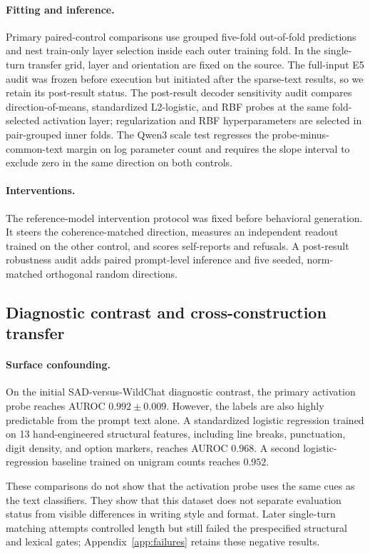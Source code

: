 \documentclass{article}
\begin{document}
\paragraph{Fitting and inference.}
Primary paired-control comparisons use grouped five-fold out-of-fold
predictions and nest train-only layer selection inside each outer training fold.
In the single-turn transfer grid, layer and orientation are fixed on the source.
The full-input E5 audit was frozen before execution but initiated after the
sparse-text results, so we retain its post-result status. The post-result decoder
sensitivity audit compares direction-of-means, standardized L2-logistic, and RBF
probes at the same fold-selected activation layer; regularization and RBF
hyperparameters are selected in pair-grouped inner folds. The Qwen3 scale test
regresses the probe-minus-common-text margin on log parameter count and requires
the slope interval to exclude zero in the same direction on both controls.

\paragraph{Interventions.}
The reference-model intervention protocol was fixed before behavioral
generation. It steers the coherence-matched direction, measures an independent
readout trained on the other control, and scores self-reports and refusals. A
post-result robustness audit adds paired prompt-level inference and five seeded,
norm-matched orthogonal random directions.

\subsection{Diagnostic contrast and cross-construction transfer}

\paragraph{Surface confounding.}

On the initial SAD-versus-WildChat diagnostic contrast, the primary
activation probe reaches AUROC $0.992\mathbin{\pm}0.009$. However, the labels
are also highly predictable from the prompt text alone. A standardized logistic
regression trained on 13 hand-engineered structural features, including line
breaks, punctuation, digit density, and option markers, reaches AUROC $0.968$.
A second logistic-regression baseline trained on unigram counts reaches
$0.952$.

These comparisons do not show that the activation probe uses the same cues as
the text classifiers. They show that this dataset does not separate evaluation
status from visible differences in writing style and format. Later single-turn
matching attempts controlled length but still failed the prespecified
structural and lexical gates; Appendix~\ref{app:failures} retains these negative
results.
\end{document}
